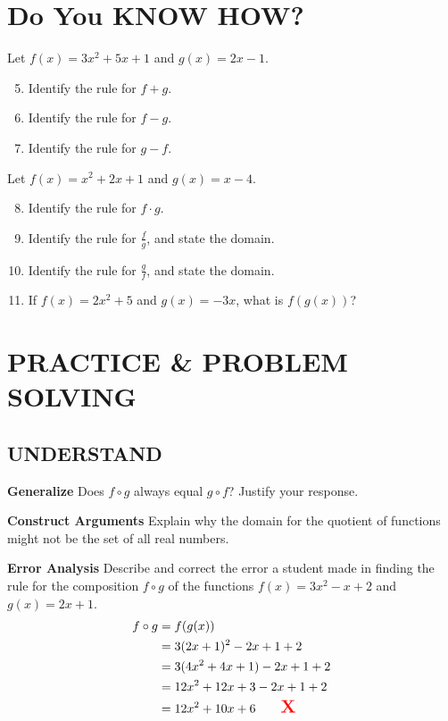 \documentclass{article}
\newenvironment{practice}[2]{}{}
\begin{document}
\section*{Do You KNOW HOW?}
Let $f(x) = 3x^2 + 5x + 1$ and $g(x) = 2x - 1$.
\begin{enumerate}
\setcounter{enumi}{4}
\item Identify the rule for $f + g$.
\item Identify the rule for $f - g$.
\item Identify the rule for $g - f$.
\end{enumerate}
Let $f(x) = x^2 + 2x + 1$ and $g(x) = x - 4$.
\begin{enumerate}
\setcounter{enumi}{7}
\item Identify the rule for $f \cdot g$.
\item Identify the rule for $\frac{f}{g}$, and state the domain.
\item Identify the rule for $\frac{g}{f}$, and state the domain.
\item If $f(x) = 2x^2 + 5$ and $g(x) = -3x$, what is $f(g(x))$?
\end{enumerate}

\section*{PRACTICE \& PROBLEM SOLVING}

\subsection*{UNDERSTAND}

\begin{practice}{12}{}
\textbf{Generalize} Does $f \circ g$ always equal $g \circ f$? Justify your response.
\end{practice}

\begin{practice}{13}{}
\textbf{Construct Arguments} Explain why the domain for the quotient of functions might not be the set of all real numbers.
\end{practice}

\begin{practice}{14}{}
\textbf{Error Analysis} Describe and correct the error a student made in finding the rule for the composition $f \circ g$ of the functions $f(x) = 3x^2 - x + 2$ and $g(x) = 2x + 1$.
\begin{align*}
f \circ g &= f(g(x)) \\
&= 3(2x + 1)^2 - 2x + 1 + 2 \\
&= 3(4x^2 + 4x + 1) - 2x + 1 + 2 \\
&= 12x^2 + 12x + 3 - 2x + 1 + 2 \\
&= 12x^2 + 10x + 6 \qquad \text{\Large \textcolor{red}{\textbf{X}}}
\end{align*}
\end{practice}
\end{document}

